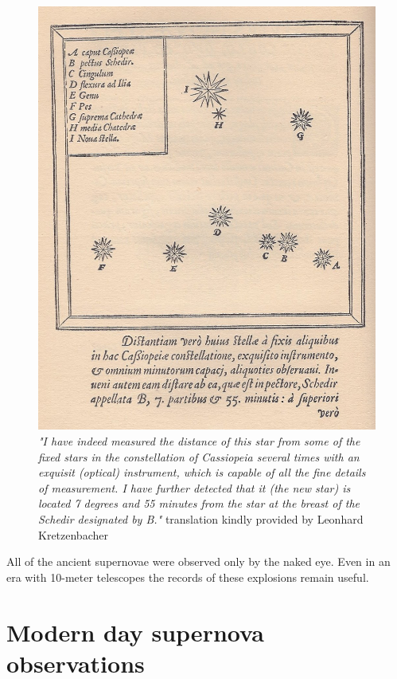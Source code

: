 \begin{figure}[htbp] %
   \centering
   \includegraphics[width=\textwidth]{chapter_intro/plots/Tycho_Cas_SN1572.jpg} 
   \caption{\textit{"I have indeed measured the distance of this star from some of the fixed stars in the constellation of Cassiopeia several times with an
exquisit (optical) instrument, which is capable of all the fine details of measurement. I have further detected that it
(the new star) is located 7 degrees and 55 minutes from the star at the breast of the Schedir designated by B."} translation kindly provided by Leonhard Kretzenbacher}
   \label{fig:sn1572_tycho_chart}
\end{figure}



All of the ancient supernovae were observed only by the naked eye. Even in an era with 10-meter telescopes the records of these explosions remain useful.

\section{Modern day supernova observations}
\label{sec:surveys}

